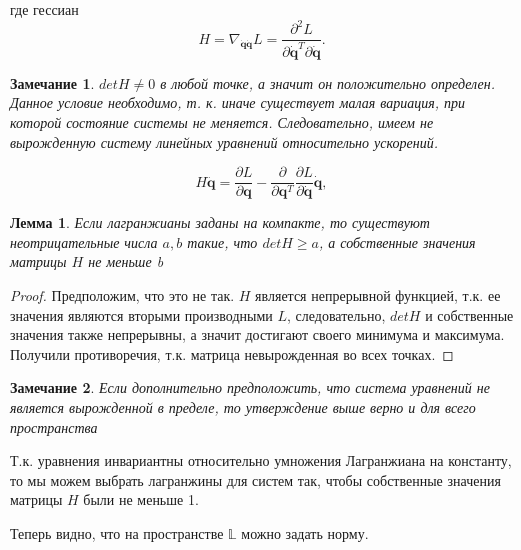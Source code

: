 \documentclass[a4paper, 12pt]{article}
\renewcommand{\ge}{\ensuremath{\geqslant}}
\newtheorem{remark}{Замечание}
\newtheorem{lemma}{Лемма}
\begin{document}
где гессиан 
\begin{equation}
H = \nabla_{\dot{\mathbf{q}}\dot{\mathbf{q}}} L = \frac{\partial^{2} L}{\partial \dot{\mathbf{q}}^T \partial \dot{\mathbf{q}}}.
\end{equation}
\begin{remark} \label{remark1}
$det H \neq 0$ в любой точке, а значит он положительно определен. Данное условие необходимо, т. к. иначе существует малая вариация, при которой состояние системы не меняется. Следовательно, имеем не вырожденную систему линейных уравнений относительно ускорений.

\begin{equation}
\label{eq:linear_equation_acc}
H\ddot{\mathbf{q}} 
= \frac{\partial L}{\partial \mathbf{q}}-\frac{\partial}{\partial \mathbf{q}^T} \frac{\partial L}{\partial \dot{\mathbf{q}}} \dot{\mathbf{q}},
\end{equation}

\end{remark}

\begin{lemma} \label{lemma1}
Если лагранжианы заданы на компакте, то существуют неотрицательные числа $a, b$ такие, что $det H \ge a$, а собственные значения матрицы $H$ не меньше b
\end{lemma}
\begin{proof}
Предположим, что это не так. $H$ является непрерывной функцией, т.к. ее значения являются вторыми производными $L$, следовательно, $det H$ и собственные значения также непрерывны, а значит достигают своего минимума и максимума. Получили противоречия, т.к. матрица невырожденная во всех точках.
\end{proof}

\begin{remark} \label{remark2}
Если дополнительно предположить, что система уравнений не является вырожденной в пределе, то утверждение выше верно и для всего пространства
\end{remark}

Т.к. уравнения инвариантны относительно умножения Лагранжиана на константу, то мы можем выбрать лагранжины для систем так, чтобы собственные значения матрицы $H$ были не меньше 1.

Теперь видно, что на пространстве $\mathbb{L}$ можно задать норму. 
\end{document}
